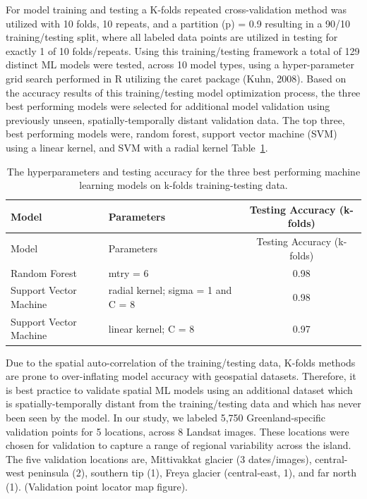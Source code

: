 \documentclass[
]{agujournal2019}
\begin{document}
For model training and testing a K-folds repeated cross-validation
method was utilized with 10 folds, 10 repeats, and a partition (p) = 0.9
resulting in a 90/10 training/testing split, where all labeled data
points are utilized in testing for exactly 1 of 10 folds/repeats. Using
this training/testing framework a total of 129 distinct ML models were
tested, across 10 model types, using a hyper-parameter grid search
performed in R utilizing the caret package (Kuhn, 2008). Based on the
accuracy results of this training/testing model optimization process,
the three best performing models were selected for additional model
validation using previously unseen, spatially-temporally distant
validation data. The top three, best performing models were, random
forest, support vector machine (SVM) using a linear kernel, and SVM with
a radial kernel Table~\ref{tbl-hyperparams}.

\begin{longtable}[]{@{}llc@{}}
\caption{The hyperparameters and testing accuracy for the three best
performing machine learning models on k-folds training-testing
data.}\label{tbl-hyperparams}\tabularnewline
\toprule\noalign{}
Model & Parameters & Testing Accuracy (k-folds) \\
\midrule\noalign{}
\endfirsthead
\toprule\noalign{}
Model & Parameters & Testing Accuracy (k-folds) \\
\midrule\noalign{}
\endhead
\bottomrule\noalign{}
\endlastfoot
Random Forest & mtry = 6 & 0.98 \\
Support Vector Machine & radial kernel; sigma = 1 and C = 8 & 0.98 \\
Support Vector Machine & linear kernel; C = 8 & 0.97 \\
\end{longtable}

Due to the spatial auto-correlation of the training/testing data,
K-folds methods are prone to over-inflating model accuracy with
geospatial datasets. Therefore, it is best practice to validate spatial
ML models using an additional dataset which is spatially-temporally
distant from the training/testing data and which has never been seen by
the model. In our study, we labeled 5,750 Greenland-specific validation
points for 5 locations, across 8 Landsat images. These locations were
chosen for validation to capture a range of regional variability across
the island. The five validation locations are, Mittivakkat glacier (3
dates/images), central-west peninsula (2), southern tip (1), Freya
glacier (central-east, 1), and far north (1). (Validation point locator
map figure).
\end{document}
